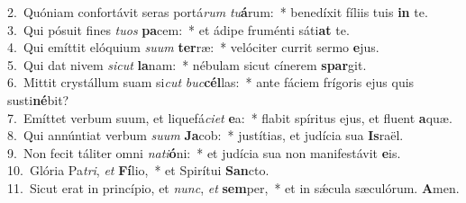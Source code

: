 {2.~}Quóniam confortávit seras portá\textit{rum} \textit{tu}\textbf{á}rum:~* benedíxit fíliis tuis \textbf{in} te.\\
{3.~}Qui pósuit fines \textit{tu}\textit{os} \textbf{pa}cem:~* et ádipe fruménti sáti\textbf{at} te.\\
{4.~}Qui emíttit elóquium \textit{su}\textit{um} \textbf{ter}ræ:~* velóciter currit sermo \textbf{e}jus.\\
{5.~}Qui dat nivem \textit{si}\textit{cut} \textbf{la}nam:~* nébulam sicut cínerem \textbf{spar}git.\\
{6.~}Mittit crystállum suam si\textit{cut} \textit{buc}\textbf{cél}las:~* ante fáciem frígoris ejus quis susti\textbf{né}bit?\\
{7.~}Emíttet verbum suum, et liquefá\textit{ci}\textit{et} \textbf{e}a:~* flabit spíritus ejus, et fluent \textbf{a}quæ.\\
{8.~}Qui annúntiat verbum \textit{su}\textit{um} \textbf{Ja}cob:~* justítias, et judícia sua \textbf{Is}raël.\\
{9.~}Non fecit táliter omni \textit{na}\textit{ti}\textbf{ó}ni:~* et judícia sua non manifestávit \textbf{e}is.\\
{10.~}Glória Pa\textit{tri}, \textit{et} \textbf{Fí}lio,~* et Spirítui \textbf{San}cto.\\
{11.~}Sicut erat in princípio, et \textit{nunc}, \textit{et} \textbf{sem}per,~* et in sǽcula sæculórum. \textbf{A}men.\\
